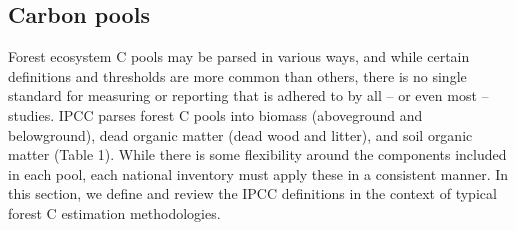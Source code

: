 \documentclass[, manuscript]{copernicus}
\begin{document}
\subsection{Carbon pools}

Forest ecosystem C pools may be parsed in various ways, and while
certain definitions and thresholds are more common than others, there is
no single standard for measuring or reporting that is adhered to by all
-- or even most -- studies. IPCC parses forest C pools into biomass
(aboveground and belowground), dead organic matter (dead wood and
litter), and soil organic matter (Table 1). While there is some
flexibility around the components included in each pool, each national
inventory must apply these in a consistent manner. In this section, we
define and review the IPCC definitions in the context of typical forest
C estimation methodologies.
\end{document}

